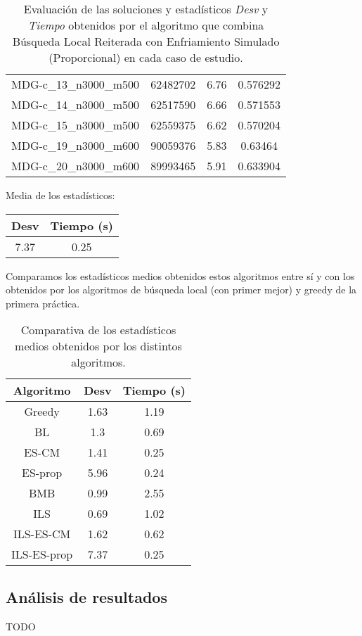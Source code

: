 \documentclass{article}
\begin{document}
\begin{table}[H]
\begin{tabular}{|cccc|}
		MDG-c\_13\_n3000\_m500 & 62482702 & 6.76 & 0.576292\\
		MDG-c\_14\_n3000\_m500 & 62517590 & 6.66 & 0.571553\\
		MDG-c\_15\_n3000\_m500 & 62559375 & 6.62 & 0.570204\\
		MDG-c\_19\_n3000\_m600 & 90059376 & 5.83 & 0.63464\\
		MDG-c\_20\_n3000\_m600 & 89993465 & 5.91 & 0.633904\\
		\hline
	\end{tabular}
	\caption{Evaluación de las soluciones y estadísticos \emph{Desv} y \emph{Tiempo} obtenidos por el algoritmo que combina
		Búsqueda Local Reiterada con Enfriamiento Simulado (Proporcional) en cada caso de estudio.}
	\label{tab:ils-es-proporcional}
\end{table}

Media de los estadísticos:
\begin{table}[H]
	\centering
	\begin{tabular}{|cc|}
		\hline
		Desv & Tiempo (s)\\ \hline
		7.37 & 0.25 \\
		\hline
	\end{tabular}
\end{table}

\pagebreak

Comparamos los estadísticos medios obtenidos estos algoritmos entre sí y con los obtenidos por los algoritmos
de búsqueda local (con primer mejor) y greedy de la primera práctica.

\begin{table}[H]
	\centering
	\begin{tabular}{|ccc|}
		\hline
		Algoritmo & Desv & Tiempo (s)\\ \hline
		Greedy & 1.63 & 1.19 \\
		BL & 1.3 & 0.69 \\
		ES-CM & 1.41 & 0.25 \\
		ES-prop & 5.96 & 0.24 \\
		BMB & 0.99 & 2.55 \\
		ILS & 0.69 & 1.02 \\
		ILS-ES-CM & 1.62 & 0.62 \\
		ILS-ES-prop & 7.37 & 0.25 \\
		\hline
	\end{tabular}
	\caption{Comparativa de los estadísticos medios obtenidos por los distintos algoritmos.}
	\label{tab:comparativa}
\end{table}

\subsection{Análisis de resultados}

TODO
\end{document}
